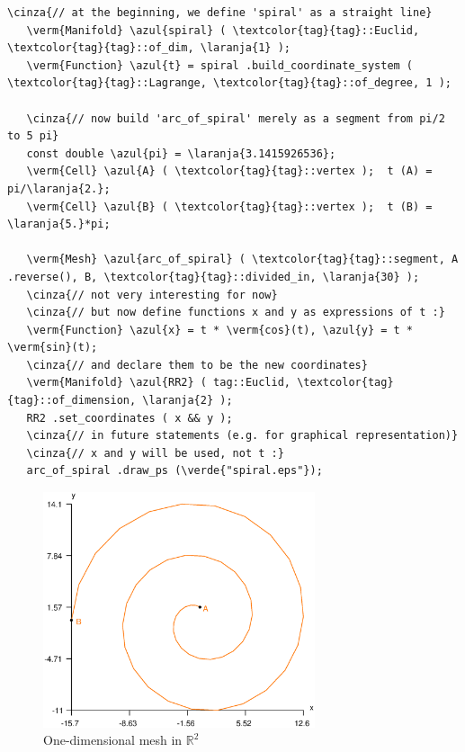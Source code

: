 \begin{Verbatim}[commandchars=\\\{\},formatcom=\small\tt,frame=single,
   label=parag-\ref{\numb section 2.\numb parag 17}.cpp,rulecolor=\color{coment},
   baselinestretch=0.94,framesep=2mm]
   \cinza{// at the beginning, we define 'spiral' as a straight line}
   \verm{Manifold} \azul{spiral} ( \textcolor{tag}{tag}::Euclid, \textcolor{tag}{tag}::of_dim, \laranja{1} );
   \verm{Function} \azul{t} = spiral .build_coordinate_system ( \textcolor{tag}{tag}::Lagrange, \textcolor{tag}{tag}::of_degree, 1 );

   \cinza{// now build 'arc_of_spiral' merely as a segment from pi/2 to 5 pi}
   const double \azul{pi} = \laranja{3.1415926536};
   \verm{Cell} \azul{A} ( \textcolor{tag}{tag}::vertex );  t (A) = pi/\laranja{2.};
   \verm{Cell} \azul{B} ( \textcolor{tag}{tag}::vertex );  t (B) = \laranja{5.}*pi;

   \verm{Mesh} \azul{arc_of_spiral} ( \textcolor{tag}{tag}::segment, A .reverse(), B, \textcolor{tag}{tag}::divided_in, \laranja{30} );
   \cinza{// not very interesting for now}
   \cinza{// but now define functions x and y as expressions of t :}
   \verm{Function} \azul{x} = t * \verm{cos}(t), \azul{y} = t * \verm{sin}(t);
   \cinza{// and declare them to be the new coordinates}
   \verm{Manifold} \azul{RR2} ( tag::Euclid, \textcolor{tag}{tag}::of_dimension, \laranja{2} );
   RR2 .set_coordinates ( x && y );
   \cinza{// in future statements (e.g. for graphical representation)}
   \cinza{// x and y will be used, not t :}
   arc_of_spiral .draw_ps (\verde{"spiral.eps"});
\end{Verbatim}

\begin{figure}[ht] \centering
  \includegraphics[width=80mm]{spiral}
  \caption{One-dimensional mesh in $ {\mathbb R}^2 $}
  \label{\numb section 2.\numb fig 19}
\end{figure}

